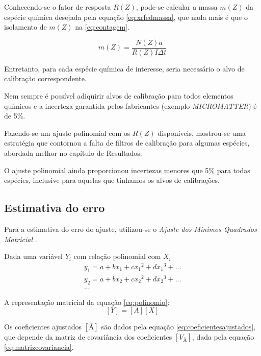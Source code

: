 Conhecendo-se o fator de resposta $R(Z)$, pode-se calcular a massa $m(Z)$ da espécie química
desejada pela equação \ref{eq:xrfedmassa}, que nada mais é que o isolamento de $m(Z)$ na 
\ref{eq:contagem}. 

\begin{equation}
  \label{eq:xrfedmassa}
  m(Z) = \frac{N(Z) a}{ R(Z)I \Delta t}
\end{equation}

Entretanto, para cada espécie química de interesse, seria necessário 
o alvo de calibração correspondente.

Nem sempre é possível adiquirir alvos de calibração para todos elementos
químicos e a incerteza garantida pelos fabricantes (exemplo \textit{MICROMATTER}) é de
5\%. 

Fazendo-se um ajuste polinomial com os $R(Z)$ disponíveis, mostrou-se uma estratégia 
que contornou a falta de filtros de calibração para algumas espécies, abordada melhor
no capítulo de Resultados. 

O ajuste polinomial ainda proporcionou incertezas menores que 5\% para todas espécies, 
inclusive para aquelas que tínhamos os alvos de calibrações.

\subsection{Estimativa do erro}

Para a estimativa do erro do ajuste, utilizou-se o 
\textit{Ajuste dos Mínimos Quadrados Matricial} \cite{helene2006}.

Dada uma variável $Y_i$ com relação polinomial com $X_i$ 
\begin{equation}
  \label{eq:polinomio}
  \begin{split}
    y_1 = a + b x_1 + c{x_1}^2 + d{x_1}^3 + ...\\
    y_2 = a + b x_2 + c{x_2}^2 + d{x_2}^3 + ... \\
    ...
  \end{split}
\end{equation}

A representação matricial da equação \ref{eq:polinomio}:
\begin{equation}
  \label{eq:polinomioMatriz}
  [Y] = [A][X]
\end{equation}

Os coeficientes ajustados $[Ã]$ são dados pela equação \ref{eq:coeficientesajustados},
que depende da matriz de covariância dos coeficientes $[V_{Ã}]$, 
dada pela equação \ref{eq:matrizcovariancia}.


